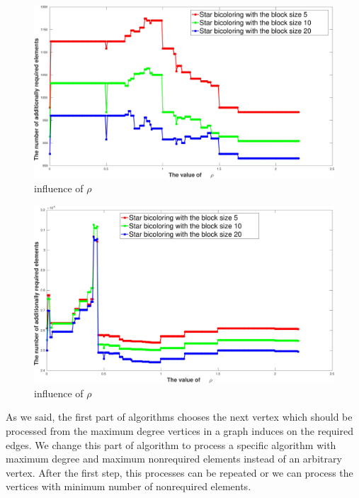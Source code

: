 \documentclass[12pt, twoside]{book}
\begin{document}
\begin{figure}
\includegraphics[width=0.9\linewidth]{rho_value_685_bus}
\caption{influence of $\rho$}
\label{rho_value_685_bus}
\end{figure}

\begin{figure}
\includegraphics[width=0.9\linewidth]{rho_value_orani678}
\caption{influence of $\rho$}
\label{rho_value_orani678}
\end{figure}

As we said, the first part of algorithms chooses the next vertex
which should be processed from the maximum degree vertices
in a graph induces on the required edges.
We change this part of algorithm to process a specific algorithm
with maximum degree and maximum nonrequired elements instead of
an arbitrary vertex. After the first step, this processes can be
repeated or we can process the vertices with
minimum number of nonrequired elements.
\end{document}
